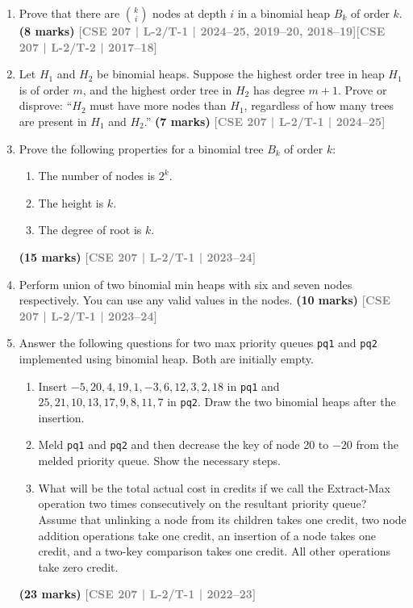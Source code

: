 \documentclass[12pt]{article}
\newcommand{\yr}[1]{\hfill\textcolor{gray}{\small\textbf{[#1]}}}
\newcommand{\mk}[1]{\textcolor{orange!70!black}{\small\textbf{(#1 marks)}}}
\begin{document}
\begin{enumerate}

\item Prove that there are $\binom{k}{i}$ nodes at depth $i$ in a binomial heap $B_k$ of order $k$.
\mk{8} \yr{CSE 207 | L-2/T-1 | 2024--25, 2019--20, 2018--19}\yr{CSE 207 | L-2/T-2 | 2017--18}




\item Let $H_1$ and $H_2$ be binomial heaps. Suppose the highest order tree in heap $H_1$ is of order $m$, and the highest order tree in $H_2$ has degree $m+1$. Prove or disprove: ``$H_2$ must have more nodes than $H_1$, regardless of how many trees are present in $H_1$ and $H_2$.''
\mk{7} \yr{CSE 207 | L-2/T-1 | 2024--25}


\item Prove the following properties for a binomial tree $B_k$ of order $k$:
\begin{enumerate}
\item The number of nodes is $2^k$.
\item The height is $k$.
\item The degree of root is $k$.
\end{enumerate}
\mk{15} \yr{CSE 207 | L-2/T-1 | 2023--24}


\item Perform union of two binomial min heaps with six and seven nodes respectively. You can use any valid values in the nodes.
\mk{10} \yr{CSE 207 | L-2/T-1 | 2023--24}


\item Answer the following questions for two max priority queues \texttt{pq1} and \texttt{pq2} implemented using binomial heap. Both are initially empty.
\begin{enumerate}
\item Insert $-5, 20, 4, 19, 1, -3, 6, 12, 3, 2, 18$ in \texttt{pq1} and $25, 21, 10, 13, 17, 9, 8, 11, 7$ in \texttt{pq2}. Draw the two binomial heaps after the insertion.
\item Meld \texttt{pq1} and \texttt{pq2} and then decrease the key of node 20 to $-20$ from the melded priority queue. Show the necessary steps.
\item What will be the total actual cost in credits if we call the Extract-Max operation two times consecutively on the resultant priority queue? Assume that unlinking a node from its children takes one credit, two node addition operations take one credit, an insertion of a node takes one credit, and a two-key comparison takes one credit. All other operations take zero credit.
\end{enumerate}
\mk{23} \yr{CSE 207 | L-2/T-1 | 2022--23}



\end{enumerate}
\end{document}
